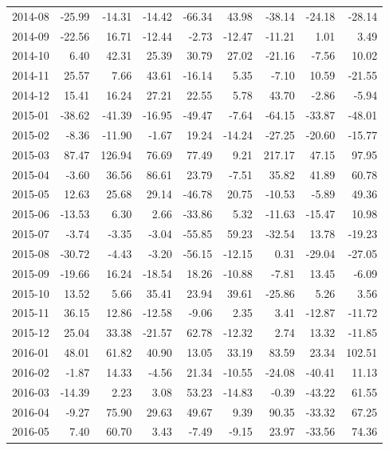 \begin{table}[ht]
\begin{tabular}{lrrrrrrrr}
  2014-08 & -25.99 & -14.31 & -14.42 & -66.34 & 43.98 & -38.14 & -24.18 & -28.14 \\ 
  2014-09 & -22.56 & 16.71 & -12.44 & -2.73 & -12.47 & -11.21 & 1.01 & 3.49 \\ 
  2014-10 & 6.40 & 42.31 & 25.39 & 30.79 & 27.02 & -21.16 & -7.56 & 10.02 \\ 
  2014-11 & 25.57 & 7.66 & 43.61 & -16.14 & 5.35 & -7.10 & 10.59 & -21.55 \\ 
  2014-12 & 15.41 & 16.24 & 27.21 & 22.55 & 5.78 & 43.70 & -2.86 & -5.94 \\ 
  2015-01 & -38.62 & -41.39 & -16.95 & -49.47 & -7.64 & -64.15 & -33.87 & -48.01 \\ 
  2015-02 & -8.36 & -11.90 & -1.67 & 19.24 & -14.24 & -27.25 & -20.60 & -15.77 \\ 
  2015-03 & 87.47 & 126.94 & 76.69 & 77.49 & 9.21 & 217.17 & 47.15 & 97.95 \\ 
  2015-04 & -3.60 & 36.56 & 86.61 & 23.79 & -7.51 & 35.82 & 41.89 & 60.78 \\ 
  2015-05 & 12.63 & 25.68 & 29.14 & -46.78 & 20.75 & -10.53 & -5.89 & 49.36 \\ 
  2015-06 & -13.53 & 6.30 & 2.66 & -33.86 & 5.32 & -11.63 & -15.47 & 10.98 \\ 
  2015-07 & -3.74 & -3.35 & -3.04 & -55.85 & 59.23 & -32.54 & 13.78 & -19.23 \\ 
  2015-08 & -30.72 & -4.43 & -3.20 & -56.15 & -12.15 & 0.31 & -29.04 & -27.05 \\ 
  2015-09 & -19.66 & 16.24 & -18.54 & 18.26 & -10.88 & -7.81 & 13.45 & -6.09 \\ 
  2015-10 & 13.52 & 5.66 & 35.41 & 23.94 & 39.61 & -25.86 & 5.26 & 3.56 \\ 
  2015-11 & 36.15 & 12.86 & -12.58 & -9.06 & 2.35 & 3.41 & -12.87 & -11.72 \\ 
  2015-12 & 25.04 & 33.38 & -21.57 & 62.78 & -12.32 & 2.74 & 13.32 & -11.85 \\ 
  2016-01 & 48.01 & 61.82 & 40.90 & 13.05 & 33.19 & 83.59 & 23.34 & 102.51 \\ 
  2016-02 & -1.87 & 14.33 & -4.56 & 21.34 & -10.55 & -24.08 & -40.41 & 11.13 \\ 
  2016-03 & -14.39 & 2.23 & 3.08 & 53.23 & -14.83 & -0.39 & -43.22 & 61.55 \\ 
  2016-04 & -9.27 & 75.90 & 29.63 & 49.67 & 9.39 & 90.35 & -33.32 & 67.25 \\ 
  2016-05 & 7.40 & 60.70 & 3.43 & -7.49 & -9.15 & 23.97 & -33.56 & 74.36 \\ 

\end{tabular}
\end{table}
